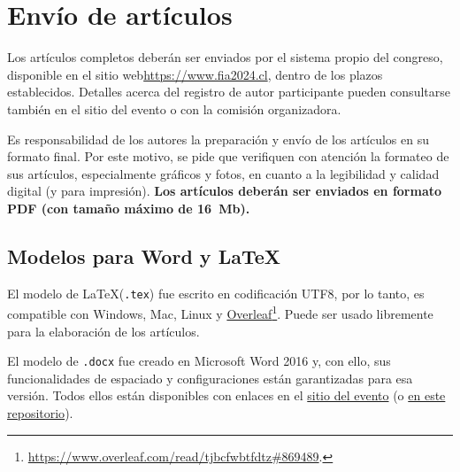 \section{Envío de artículos}

Los artículos completos deberán ser enviados por el sistema propio del congreso, disponible en el sitio web\linebreak \url{https://www.fia2024.cl}, dentro de los plazos establecidos. Detalles acerca del registro de autor participante pueden consultarse también en el sitio del evento o con la comisión organizadora.

Es responsabilidad de los autores la preparación y envío de los artículos en su formato final. Por este motivo, se pide que verifiquen con atención la formateo de sus artículos, especialmente gráficos y fotos, en cuanto a la legibilidad y calidad digital (y para impresión). \textbf{Los artículos deberán ser enviados en formato PDF (con tamaño máximo de 16~Mb).}





\subsection{Modelos para Word y \LaTeX}

El modelo de \LaTeX\xspace (\texttt{.tex}) fue escrito en codificación UTF8, por lo tanto, es compatible con Windows, Mac, Linux y \href{https://www.overleaf.com/read/tjbcfwbtfdtz\#869489}{Overleaf}\footnote{\url{https://www.overleaf.com/read/tjbcfwbtfdtz\#869489}.}. Puede ser usado libremente para la elaboración de los artículos.

El modelo de \texttt{.docx} fue creado en Microsoft Word 2016 y, con ello, sus funcionalidades de espaciado y configuraciones están garantizadas para esa versión. Todos ellos están disponibles con enlaces en el \href{https://www.fia2024.cl}{sitio del evento} (o \href{https://github.com/willdfonseca/latex}{en este repositorio}).

